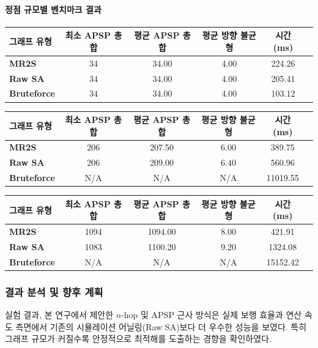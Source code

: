 \documentclass[11pt,a4paper]{article}
\begin{document}
\paragraph{정점 규모별 벤치마크 결과}
\begin{table}[ht]
\centering
{}
\begin{tabular}{|l|c|c|c|c|c|}
    \hline
    그래프 유형 & 최소 APSP 총합 & 평균 APSP 총합 & 평균 방향 불균형 & 시간(ms) \\ \hline
    \textbf{MR2S} & 34 & 34.00 & 4.00 & 224.26 \\ \hline
    \textbf{Raw SA} & 34 & 34.00 & 4.00 & 205.41 \\ \hline
    \textbf{Bruteforce} & 34 & 34.00 & 4.00 & 103.12 \\ \hline
\end{tabular}

\vspace{0.3cm}
\begin{tabular}{|l|c|c|c|c|c|}
    \hline
    그래프 유형 & 최소 APSP 총합 & 평균 APSP 총합 & 평균 방향 불균형 & 시간(ms) \\ \hline
    \textbf{MR2S} & 206 & 207.50 & 6.00 & 389.75 \\ \hline
    \textbf{Raw SA} & 206 & 209.00 & 6.40 & 560.96 \\ \hline
    \textbf{Bruteforce} & N/A & N/A & N/A & 11019.55 \\ \hline
\end{tabular}

\vspace{0.3cm}
\begin{tabular}{|l|c|c|c|c|c|}
    \hline
    그래프 유형 & 최소 APSP 총합 & 평균 APSP 총합 & 평균 방향 불균형 & 시간(ms) \\ \hline
    \textbf{MR2S} & 1094 & 1094.00 & 8.00 & 421.91 \\ \hline
    \textbf{Raw SA} & 1083 & 1100.20 & 9.20 & 1324.08 \\ \hline
    \textbf{Bruteforce} & N/A & N/A & N/A & 15152.42 \\ \hline
\end{tabular}
\end{table}

\subsubsection{결과 분석 및 향후 계획}
실험 결과, 본 연구에서 제안한 $n$-hop 및 APSP 근사 방식은 실제 보행
효율과 연산 속도 측면에서 기존의 시뮬레이션 어닐링(Raw SA)보다
더 우수한 성능을 보였다.
특히 그래프 규모가 커질수록 안정적으로 최적해를 도출하는 경향을
확인하였다.
\end{document}
